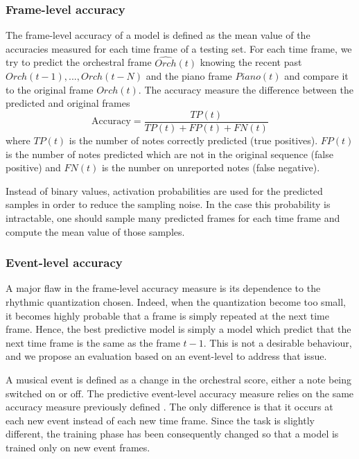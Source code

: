 \documentclass[letterpaper]{article}
\begin{document}
\subsubsection{Frame-level accuracy}
The frame-level accuracy of a model is defined as the mean value of the accuracies measured for each time frame of a testing set.
For each time frame, we try to predict the orchestral frame $\hat{Orch}(t)$ knowing the recent past $Orch(t-1),...,Orch(t-N)$ and the piano frame $Piano(t)$ and compare it to the original frame $Orch(t)$. The accuracy measure the difference between the predicted and original frames \cite{boulanger2012modeling,DBLP:journals/corr/LiuR14a}
\begin{equation}
\text{Accuracy}  = \frac{TP(t)}{TP(t) + FP(t) + FN(t)}
\label{eq:accuracy}
\end{equation}
where $TP(t)$ is the number of notes correctly predicted (true positives). $FP(t)$ is the number of notes predicted which are not in the original sequence (false positive) and $FN(t)$ is the number on unreported notes (false negative). 

Instead of binary values, activation probabilities are used for the predicted samples in order to reduce the sampling noise. In the case this probability is intractable, one should sample many predicted frames for each time frame and compute the mean value of those samples.

\subsubsection{Event-level accuracy}
A major flaw in the frame-level accuracy measure is its dependence to the rhythmic quantization chosen. Indeed, when the quantization become too small, it becomes highly probable that a frame is simply repeated at the next time frame. Hence, the best predictive model is simply a model which predict that the next time frame is the same as the frame $t-1$. This is not a desirable behaviour, and we propose an evaluation based on an event-level to address that issue.

A musical event is defined as a change in the orchestral score, either a note being switched on or off. The predictive event-level accuracy measure relies on the same accuracy measure previously defined . The only difference is that it occurs at each new event instead of each new time frame. Since the task is slightly different, the training phase has been consequently changed so that a model is trained only on new event frames.
\end{document}
